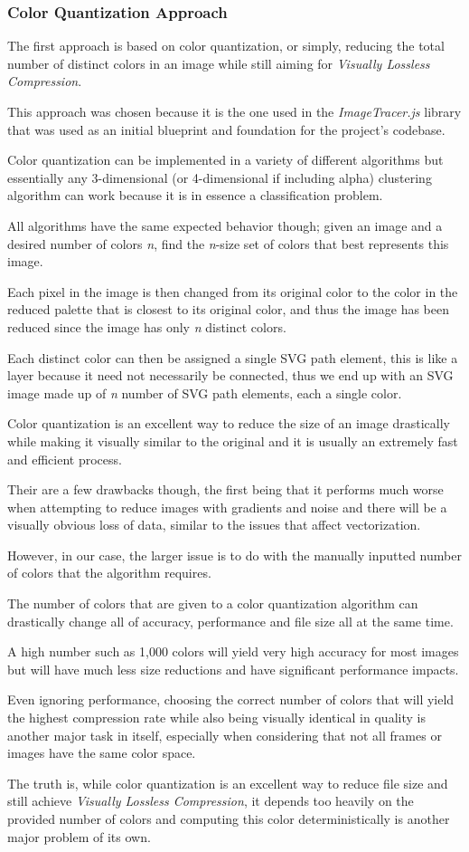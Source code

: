 \documentclass[12pt]{article}
\newcommand{\sentence}{} %
\newcommand{\italic}[1]{\textit{#1}}
\begin{document}
    \subsubsection{Color Quantization Approach}\label{subsubsec:color-quantization-approach}

    \tab
    The first approach is based on color quantization, or simply, reducing the total number of distinct
    colors in an image while still aiming for \italic{Visually Lossless Compression}.
    \sentence
    This approach was chosen because it is the one used in the \italic{ImageTracer.js} library that
    was used as an initial blueprint and foundation for the project's codebase.
    \sentence
    Color quantization can be implemented in a variety of different algorithms but essentially any 3-dimensional (or
    4-dimensional if including alpha) clustering algorithm can work because it is in essence a classification problem.
    \sentence
    All algorithms have the same expected behavior though;
    given an image and a desired number of colors \italic{n}, find the \italic{n}-size set of colors that best
    represents this image.
    \sentence
    Each pixel in the image is then changed from its original color to the color in the reduced palette that is
    closest to its original color, and thus the image has been reduced since the image has only \italic{n} distinct
    colors.
    \sentence
    Each distinct color can then be assigned a single SVG path element, this is like a layer because it need not
    necessarily be connected, thus we end up with an SVG image made up of \italic{n} number of SVG path elements,
    each a single color.

    \bigskip
    Color quantization is an excellent way to reduce the size of an image drastically while making it visually
    similar to the original and it is usually an extremely fast and efficient process.
    \sentence
    Their are a few drawbacks though, the first being that it performs much worse when attempting to reduce images
    with gradients and noise and there will be a visually obvious loss of data, similar to the issues that affect
    vectorization.
    \sentence
    However, in our case, the larger issue is to do with the manually inputted number of colors that the algorithm
    requires.
    \sentence
    The number of colors that are given to a color quantization algorithm can drastically change all of accuracy,
    performance and file size all at the same time.
    \sentence
    A high number such as 1,000 colors will yield very high accuracy for most images but will have much less size
    reductions and have significant performance impacts.
    \sentence
    Even ignoring performance, choosing the correct number of colors that will yield the highest compression rate while
    also being visually identical in quality is another major task in itself, especially when considering that not
    all frames or images have the same color space.
    \sentence
    The truth is, while color quantization is an excellent way to reduce file size and still achieve
    \italic{Visually Lossless Compression}, it depends too heavily on the provided number of colors and
    computing this color deterministically is another major problem of its own.
\end{document}
